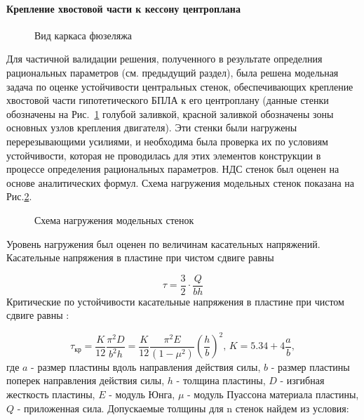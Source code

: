 \paragraph{Крепление хвостовой части к кессону центроплана}
 
\label{sec:pants}
\begin{figure}[H]
\centering
\def\svgwidth{\textwidth}

\caption{Вид каркаса фюзеляжа}
\label{fig:IsoviewOfPants}
\end{figure}


Для частичной валидации решения, полученного в результате определния рациональных параметров (см. предыдущий раздел), была решена модельная задача по оценке устойчивости центральных стенок, обеспечивающих крепление хвостовой части гипотетического БПЛА к его центроплану (данные стенки обозначены на Рис.~\ref{fig:IsoviewOfPants} голубой заливкой, красной заливкой обозначены зоны основных узлов крепления двигателя). Эти стенки были нагружены перерезывающими усилиями, и необходима была проверка их по условиям устойчивости, которая не проводилась для этих элементов конструкции в процессе определения рациональных параметров. НДС стенок был оценен на основе аналитических формул. Схема нагружения модельных стенок показана на Рис.\ref{fig:IsoviewOfPantsModel}.

\begin{figure}[H]
\centering

\caption{Схема нагружения модельных стенок}
\label{fig:IsoviewOfPantsModel}
\end{figure}

%


Уровень нагружения был оценен по величинам касательных напряжений. Касательные напряжения в пластине при чистом сдвиге равны

\begin{equation}
\tau=\frac{3}{2}\cdot\frac{Q}{bh}
\end{equation}
Критические по устойчивости касательные напряжения в пластине при чистом сдвиге равны \cite{Volmir}:

\begin{equation}
\tau_\text{кр}=\frac{K}{12}\frac{\pi^2D}{b^2h} = \frac{K}{12}\frac{\pi^2E}{(1-\mu^2)}\left(\frac{h}{b}\right)^2,\, K=5.34 + 4\frac{a}{b},
\end{equation}
где $a$ - размер пластины вдоль направления действия силы, $b$ - размер пластины поперек направления действия силы, $h$ - толщина пластины, $D$ - изгибная жесткость пластины, $E$ - модуль Юнга, $\mu$ - модуль Пуассона материала пластины, $Q$ - приложенная сила.
Допускаемые толщины для n стенок найдем из условия:

